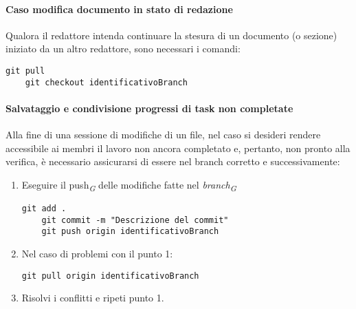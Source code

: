 \paragraph*{\textbf{Caso modifica documento in stato di redazione}}
Qualora il redattore intenda continuare la stesura di un documento (o sezione) iniziato da un altro redattore, sono necessari i comandi:
\begin{lstlisting}[style=code]
    git pull
    git checkout identificativoBranch
\end{lstlisting}

\hypertarget{par:salvataggioecondivisioneprogressitasknoncompletate}{\paragraph*{{\textbf{Salvataggio e condivisione progressi di task non completate}}}}
Alla fine di una sessione di modifiche di un file, nel caso si desideri rendere accessibile ai membri il lavoro non ancora completato e, pertanto, non pronto alla verifica, è necessario assicurarsi di essere nel branch corretto e successivamente:
\begin{enumerate}
    \item Eseguire il push\textsubscript{\textit{G}}  delle modifiche fatte nel \textit{branch}\textsubscript{\textit{G}}
          \begin{lstlisting}[style=code]
    git add .
    git commit -m "Descrizione del commit"
    git push origin identificativoBranch
        \end{lstlisting}

    \item Nel caso di problemi con il punto 1:
          \begin{lstlisting}[style=code]
   git pull origin identificativoBranch
        \end{lstlisting}
    \item Risolvi i conflitti e ripeti punto 1.
\end{enumerate}

\vspace{0.3cm}

